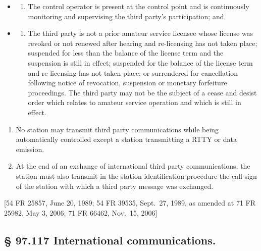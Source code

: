 \documentclass[
  letterpaper,
  DIV=11,
  numbers=noendperiod]{scrreport}
\providecommand{\tightlist}{%
  \setlength{\itemsep}{0pt}\setlength{\parskip}{0pt}}\usepackage{longtable,booktabs,array}
\begin{document}
\begin{itemize}
\item
  \begin{enumerate}
  \def\labelenumi{(\arabic{enumi})}
  \tightlist
  \item
    The control operator is present at the control point and is
    continuously monitoring and supervising the third party's
    participation; and
  \end{enumerate}
\item
  \begin{enumerate}
  \def\labelenumi{(\arabic{enumi})}
  \setcounter{enumi}{1}
  \tightlist
  \item
    The third party is not a prior amateur service licensee whose
    license was revoked or not renewed after hearing and re-licensing
    has not taken place; suspended for less than the balance of the
    license term and the suspension is still in effect; suspended for
    the balance of the license term and re-licensing has not taken
    place; or surrendered for cancellation following notice of
    revocation, suspension or monetary forfeiture proceedings. The third
    party may not be the subject of a cease and desist order which
    relates to amateur service operation and which is still in effect.
  \end{enumerate}
\end{itemize}

\begin{enumerate}
\def\labelenumi{(\alph{enumi})}
\setcounter{enumi}{2}
\item
  No station may transmit third party communications while being
  automatically controlled except a station transmitting a RTTY or data
  emission.
\item
  At the end of an exchange of international third party communications,
  the station must also transmit in the station identification procedure
  the call sign of the station with which a third party message was
  exchanged.
\end{enumerate}

{[}54 FR 25857, June 20, 1989; 54 FR 39535, Sept.~27, 1989, as amended
at 71 FR 25982, May 3, 2006; 71 FR 66462, Nov.~15, 2006{]}

\hypertarget{97.117}{%
\subsection*{§ 97.117 International communications.}\label{97.117}}
\end{document}
